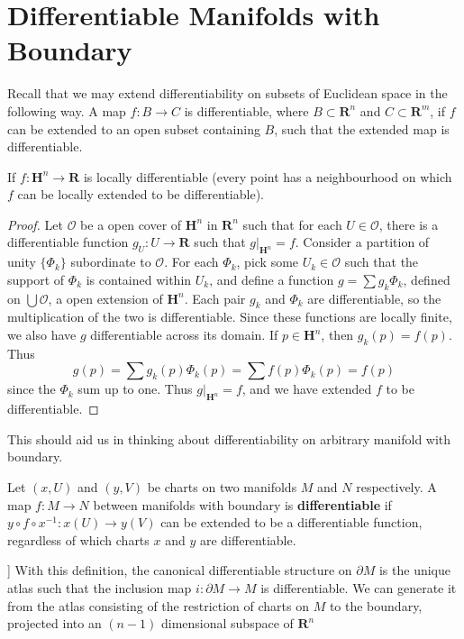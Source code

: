 \section{Differentiable Manifolds with Boundary}

Recall that we may extend differentiability on subsets of Euclidean space in the following way. A map $f:B \to C$ is differentiable, where $B \subset \mathbf{R}^n$ and $C \subset \mathbf{R}^m$, if $f$ can be extended to an open subset containing $B$, such that the extended map is differentiable.

\begin{theorem}
    If $f:\mathbf{H}^n \to \mathbf{R}$ is locally differentiable (every point has a neighbourhood on which $f$ can be locally extended to be differentiable).
\end{theorem}
\begin{proof}
    Let $\mathcal{O}$ be a open cover of $\mathbf{H}^n$ in $\mathbf{R}^n$ such that for each $U \in \mathcal{O}$, there is a differentiable function $g_U:U \to \mathbf{R}$ such that $g|_{\mathbf{H}^n} = f$. Consider a partition of unity $\{ \Phi_k \}$ subordinate to $\mathcal{O}$. For each $\Phi_k$, pick some $U_k \in \mathcal{O}$ such that the support of $\Phi_k$ is contained within $U_k$, and define a function $g = \sum g_k \Phi_k$, defined on $\bigcup \mathcal{O}$, a open extension of $\mathbf{H}^n$. Each pair $g_k$ and $\Phi_k$ are differentiable, so the multiplication of the two is differentiable. Since these functions are locally finite, we also have $g$ differentiable across its domain. If $p \in \mathbf{H}^n$, then $g_k(p) = f(p)$. Thus
    \[ g(p) = \sum g_k(p) \Phi_k(p) = \sum f(p) \Phi_k(p) = f(p) \]
    since the $\Phi_k$ sum up to one. Thus $g|_{\mathbf{H}^n} = f$, and we have extended $f$ to be differentiable.
\end{proof}

This should aid us in thinking about differentiability on arbitrary manifold with boundary.

\begin{definition}
    Let $(x,U)$ and $(y,V)$ be charts on two manifolds $M$ and $N$ respectively. A map $f:M \to N$ between manifolds with boundary is {\bf differentiable} if $y \circ f \circ x^{-1}:x(U) \to y(V)$ can be extended to be a differentiable function, regardless of which charts $x$ and $y$ are differentiable.
\end{definition}

\begin{example}]
    With this definition, the canonical differentiable structure on $\partial M$ is the unique atlas such that the inclusion map $i:\partial M \to M$ is differentiable. We can generate it from the atlas consisting of the restriction of charts on $M$ to the boundary, projected into an $(n-1)$ dimensional subspace of $\mathbf{R}^n$
\end{example}